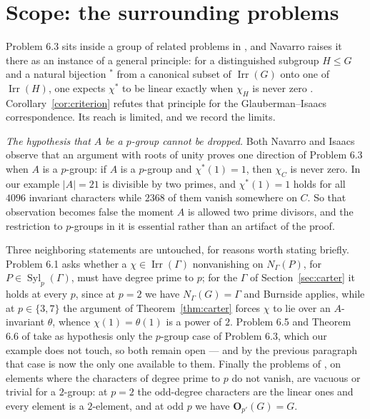 \documentclass[11pt]{article}
\theoremstyle{definition}
\theoremstyle{remark}
\newcommand{\Irr}{\operatorname{Irr}}
\begin{document}
\section{Scope: the surrounding problems}\label{sec:navarro}

Problem 6.3 sits inside a group of related problems in
\cite{navarro-problems}, and Navarro raises it there as an instance of a
general principle: for a distinguished subgroup $H\le G$ and a natural
bijection ${}^*$ from a canonical subset of $\Irr(G)$ onto one of
$\Irr(H)$, one expects $\chi^*$ to be linear exactly when $\chi_H$ is
never zero \cite[p.~189]{navarro-problems}.  Corollary~\ref{cor:criterion}
refutes that principle for the Glauberman--Isaacs correspondence.  Its
reach is limited, and we record the limits.

\emph{The hypothesis that $A$ be a $p$-group cannot be dropped.}
Both Navarro \cite[p.~189]{navarro-problems} and Isaacs
\cite[\S7]{isaacs-carter} observe that an argument with roots of unity
proves one direction of Problem 6.3 when $A$ is a $p$-group: if $A$ is a
$p$-group and $\chi^*(1)=1$, then $\chi_C$ is never zero.  In our
example $|A|=21$ is divisible by two primes, and $\chi^*(1)=1$ holds for
all $4096$ invariant characters while $2368$ of them vanish somewhere on
$C$.  So that observation becomes false the moment $A$ is allowed two
prime divisors, and the restriction to $p$-groups in it is essential
rather than an artifact of the proof.

Three neighboring statements are untouched, for reasons worth stating
briefly.  Problem 6.1 asks whether a $\chi\in\Irr(\Gamma)$ nonvanishing
on $N_\Gamma(P)$, for $P\in\operatorname{Syl}_p(\Gamma)$, must have
degree prime to $p$; for the $\Gamma$ of Section~\ref{sec:carter} it
holds at every $p$, since at $p=2$ we have $N_\Gamma(G)=\Gamma$ and
Burnside applies, while at $p\in\{3,7\}$ the argument of
Theorem~\ref{thm:carter} forces $\chi$ to lie over an $A$-invariant
$\theta$, whence $\chi(1)=\theta(1)$ is a power of $2$.  Problem 6.5
and Theorem 6.6 of \cite{navarro-problems} take as hypothesis only the
$p$-group case of Problem 6.3, which our example does not touch, so
both remain open --- and by the previous paragraph that case is now the
only one available to them.  Finally the problems of
\cite[\S5]{navarro-problems}, on elements where the characters of
degree prime to $p$ do not vanish, are vacuous or trivial for a
$2$-group: at $p=2$ the odd-degree characters are the linear ones and
every element is a $2$-element, and at odd $p$ we have
$\mathbf O_{p'}(G)=G$.
\end{document}
